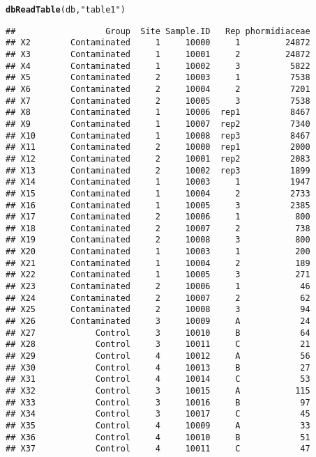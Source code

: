 \documentclass[12pt]{beamer}\usepackage[]{graphicx}\usepackage[]{color}
\makeatletter
\newcommand{\hlstr}[1]{\textcolor[rgb]{0.192,0.494,0.8}{#1}}%
\newcommand{\hlstd}[1]{\textcolor[rgb]{0.345,0.345,0.345}{#1}}%
\newcommand{\hlkwd}[1]{\textcolor[rgb]{0.737,0.353,0.396}{\textbf{#1}}}%
\newenvironment{kframe}{%
 \def\at@end@of@kframe{}%
 \ifinner\ifhmode%
  \def\at@end@of@kframe{\end{minipage}}%
  \begin{minipage}{\columnwidth}%
 \fi\fi%
 \def\FrameCommand##1{\hskip\@totalleftmargin \hskip-\fboxsep
 \colorbox{shadecolor}{##1}\hskip-\fboxsep
     \hskip-\linewidth \hskip-\@totalleftmargin \hskip\columnwidth}%
 \MakeFramed {\advance\hsize-\width
   \@totalleftmargin\z@ \linewidth\hsize
   \@setminipage}}%
 {\par\unskip\endMakeFramed%
 \at@end@of@kframe}
\newenvironment{knitrout}{}{} %
\makeatother
\begin{document}
\begin{frame}[fragile]
\begin{knitrout}
\begin{kframe}
{\ttfamily\noindent\bfseries\color{errorcolor}{\#\# Error: Table table1 exists in database, and both overwrite and append are FALSE}}\begin{alltt}
\hlkwd{dbReadTable}\hlstd{(db,}\hlstr{"table1"}\hlstd{)}
\end{alltt}
\begin{verbatim}
##                  Group  Site Sample.ID   Rep phormidiaceae
## X2        Contaminated     1     10000     1         24872
## X3        Contaminated     1     10001     2         24872
## X4        Contaminated     1     10002     3          5822
## X5        Contaminated     2     10003     1          7538
## X6        Contaminated     2     10004     2          7201
## X7        Contaminated     2     10005     3          7538
## X8        Contaminated     1     10006  rep1          8467
## X9        Contaminated     1     10007  rep2          7340
## X10       Contaminated     1     10008  rep3          8467
## X11       Contaminated     2     10000  rep1          2000
## X12       Contaminated     2     10001  rep2          2083
## X13       Contaminated     2     10002  rep3          1899
## X14       Contaminated     1     10003     1          1947
## X15       Contaminated     1     10004     2          2733
## X16       Contaminated     1     10005     3          2385
## X17       Contaminated     2     10006     1           800
## X18       Contaminated     2     10007     2           738
## X19       Contaminated     2     10008     3           800
## X20       Contaminated     1     10003     1           200
## X21       Contaminated     1     10004     2           189
## X22       Contaminated     1     10005     3           271
## X23       Contaminated     2     10006     1            46
## X24       Contaminated     2     10007     2            62
## X25       Contaminated     2     10008     3            94
## X26       Contaminated     3     10009     A            24
## X27            Control     3     10010     B            64
## X28            Control     3     10011     C            21
## X29            Control     4     10012     A            56
## X30            Control     4     10013     B            27
## X31            Control     4     10014     C            53
## X32            Control     3     10015     A           115
## X33            Control     3     10016     B            97
## X34            Control     3     10017     C            45
## X35            Control     4     10009     A            33
## X36            Control     4     10010     B            51
## X37            Control     4     10011     C            47

\end{verbatim}
\end{kframe}
\end{knitrout}
\end{frame}
\end{document}

